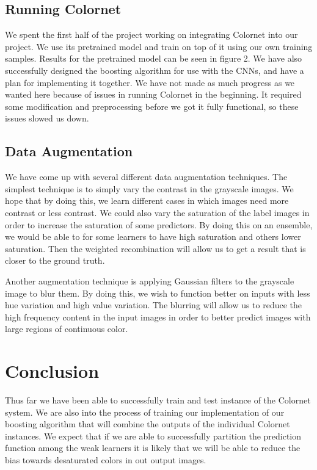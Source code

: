 \documentclass[10pt,twocolumn,letterpaper]{article}
\begin{document}
\subsection{Running Colornet}
We spent the first half of the project working on integrating Colornet into our project. We use its pretrained model and train on top of it using our own training samples. Results for the pretrained model can be seen in figure 2. We have also successfully designed the boosting algorithm for use with the CNNs, and have a plan for implementing it together. We have not made as much progress as we wanted here because of issues in running Colornet in the beginning. It required some modification and preprocessing before we got it fully functional, so these issues slowed us down.

\subsection{Data Augmentation}
We have come up with several different data augmentation techniques. The simplest technique is to simply vary the contrast in the grayscale images. We hope that by doing this, we learn different cases in which images need more contrast or less contrast. We could also vary the saturation of the label images in order to increase the saturation of some predictors. By doing this on an ensemble, we would be able to for some learners to have high saturation and others lower saturation. Then the weighted recombination will allow us to get a result that is closer to the ground truth.

Another augmentation technique is applying Gaussian filters to the grayscale image to blur them. By doing this, we wish to function better on inputs with less hue variation and high value variation. The blurring will allow us to reduce the high frequency content in the input images in order to better predict images with large regions of continuous color.

\section{Conclusion}
Thus far we have been able to successfully train and test instance of the Colornet system. We are also into the process of training our implementation of our boosting algorithm that will combine the outputs of the individual Colornet instances. We expect that if we are able to successfully partition the prediction function among the weak learners it is likely that we will be able to reduce the bias towards desaturated colors in out output images.
\end{document}
